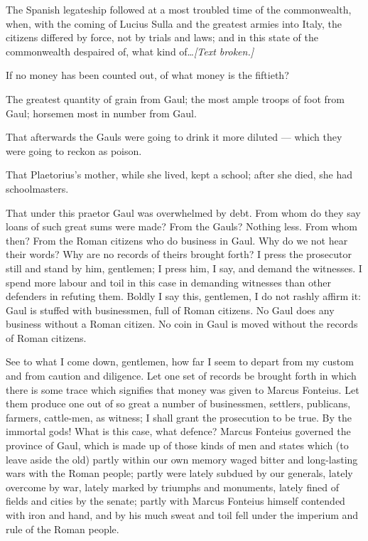  The Spanish legateship followed at a most troubled time of the commonwealth, when, with the coming of Lucius Sulla and the greatest armies into Italy, the citizens differed by force, not by trials and laws; and in this state of the commonwealth despaired of, what kind of\ldots \textit{[Text broken.]}

 If no money has been counted out, of what money is the fiftieth?

 The greatest quantity of grain from Gaul; the most ample troops of foot from Gaul; horsemen most in number from Gaul.

 That afterwards the Gauls were going to drink it more diluted --- which they were going to reckon as poison.

 That Plaetorius's mother, while she lived, kept a school; after she died, she had schoolmasters.

 That under this praetor Gaul was overwhelmed by debt. From whom do they say loans of such great sums were made? From the Gauls? Nothing less. From whom then? From the Roman citizens who do business in Gaul. Why do we not hear their words? Why are no records of theirs brought forth? I press the prosecutor still and stand by him, gentlemen; I press him, I say, and demand the witnesses. I spend more labour and toil in this case in demanding witnesses than other defenders in refuting them. Boldly I say this, gentlemen, I do not rashly affirm it: Gaul is stuffed with businessmen, full of Roman citizens. No Gaul does any business without a Roman citizen. No coin in Gaul is moved without the records of Roman citizens.

 See to what I come down, gentlemen, how far I seem to depart from my custom and from caution and diligence. Let one set of records be brought forth in which there is some trace which signifies that money was given to Marcus Fonteius. Let them produce one out of so great a number of businessmen, settlers, publicans, farmers, cattle-men, as witness; I shall grant the prosecution to be true. By the immortal gods! What is this case, what defence? Marcus Fonteius governed the province of Gaul, which is made up of those kinds of men and states which (to leave aside the old) partly within our own memory waged bitter and long-lasting wars with the Roman people; partly were lately subdued by our generals, lately overcome by war, lately marked by triumphs and monuments, lately fined of fields and cities by the senate; partly with Marcus Fonteius himself contended with iron and hand, and by his much sweat and toil fell under the imperium and rule of the Roman people.

